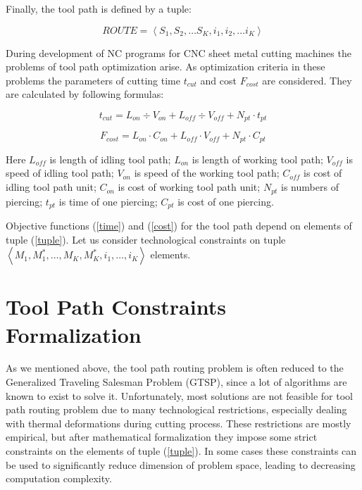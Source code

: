 \documentclass{../download/tPRS2e}
\begin{document}
Finally, the tool path is defined by a tuple:

\begin{equation} \label {tuple}
ROUTE = \left < S_1, S_2, \dots S_K, i_1, i_2, \dots i_K \right > 
\end{equation}

During development of NC programs for CNC sheet metal cutting machines the problems of tool path optimization arise.
As optimization criteria in these problems the parameters of cutting time $t_{cut}$ and cost $F_{cost}$ are considered.
They are calculated by following formulas:

\begin{equation} \label{time}
t_{cut} = L_{on} \div V_{on} + L_{off} \div V_{off} + N_{pt} \cdot t_{pt}
\end{equation}

\begin{equation} \label {cost}
F_{cost} = L_{on} \cdot C_{on} + L_{off} \cdot V_{off} + N_{pt} \cdot C_{pt}
\end{equation}

Here $L_{off}$ is length of idling tool path;
$L_{on}$ is length of working tool path;
$V_{off}$ is speed of idling tool path;
$V_{on}$ is speed of the working tool path;
$C_{off}$ is cost of idling tool path unit;
$C_{on}$ is cost of working tool path unit;
$N_{pt}$ is numbers of piercing;
$t_{pt}$ is time of one piercing;
$C_{pt}$ is cost of one piercing.

Objective functions (\ref{time}) and (\ref{cost})
for the tool path depend on elements of tuple (\ref{tuple}).
Let us consider technological constraints on tuple
$\left <M_1, M_1^*, \dots , M_K, M_K^*, i_1, \dots , i_K \right >$
elements.

\section{Tool Path Constraints Formalization}

As we mentioned above,
the tool path routing problem is often reduced to the Generalized Traveling Salesman Problem (GTSP),
since a lot of algorithms are known to exist to solve it.
Unfortunately, most solutions are not feasible for tool path routing problem due to many technological restrictions,
especially dealing with thermal deformations during cutting process.
These restrictions are mostly empirical,
but after mathematical formalization they impose some strict constraints on the elements of tuple (\ref{tuple}).
In some cases these constraints can be used to significantly reduce dimension of problem space,
leading to decreasing computation complexity.
\end{document}
